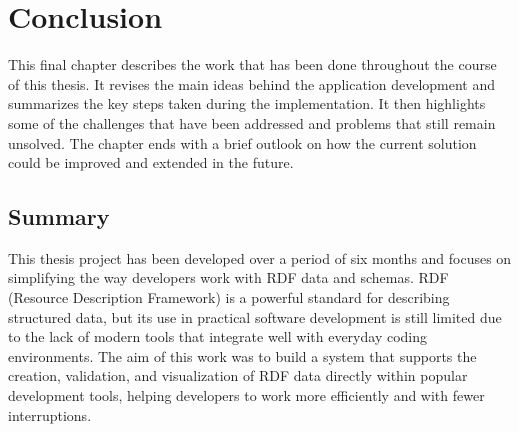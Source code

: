 \chapter{Conclusion\label{cha:chapter6}}
This final chapter describes the work that has been done throughout the course of this thesis. It revises the main ideas behind the application development and summarizes the key steps taken during the implementation. 
It then highlights some of the challenges that have been addressed and problems that still remain unsolved.
The chapter ends with a brief outlook on how the current solution could be improved and extended in the future.
\section{Summary\label{sec:summary}}


This thesis project has been developed over a period of six months and focuses on simplifying the way developers work with RDF data and schemas. RDF (Resource Description Framework) is a powerful standard for describing structured data, but its use in practical software development is still limited due to the lack of modern tools that integrate well with everyday coding environments. The aim of this work was to build a system that supports the creation, validation, and visualization of RDF data directly within popular development tools, helping developers to work more efficiently and with fewer interruptions.

